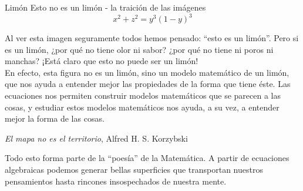 \begin{surferPage}{Lim\'on}
Esto no es un lim\'on - la traici\'on de las im\'agenes\\
\smallskip
\[x^2 + z^2 = y^3 (1 - y)^3\] 

\vspace{0.3cm}
Al ver esta imagen seguramente todos hemos pensado: “esto es un lim\'on”. Pero si es un lim\'on, ¿por qu\'e no tiene olor ni sabor? ¿por qu\'e no tiene ni poros ni manchas? ¡Est\'a claro que esto no puede ser un lim\'on!\\
\vspace{0.3cm}
En efecto, esta figura no es un lim\'on, sino un modelo matem\'atico de un lim\'on, que nos ayuda a entender mejor las propiedades de la forma que tiene \'este. Las ecuaciones nos permiten construir modelos matem\'aticos que se parecen a las cosas, y estudiar estos modelos matem\'aticos nos ayuda, a su vez, a entender mejor la forma de las cosas.
\vspace{0.3cm}
\begin{center}
\emph{El mapa no es el territorio}, Alfred H. S. Korzybski
\end{center}
\vspace{0.3cm}
Todo esto forma parte de la “poes\'ia” de la Matem\'atica. A partir de ecuaciones algebraicas podemos generar bellas superficies que transportan nuestros pensamientos hasta rincones insospechados de nuestra mente.
\end{surferPage}
